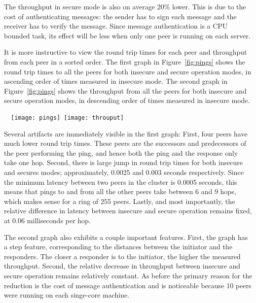 \documentclass[11pt]{article}
\begin{document}
The throughput in secure mode is also on average 20\% lower.  This
is due to the cost of authenticating messages: the sender has to
sign each message and the receiver has to verify the message.  Since
message authentication is a CPU bounded task, its effect will be
less when only one peer is running on each server.

It is more instructive to view the round trip times for each peer
and throughput from each peer in a sorted order.  The first graph
in Figure~\ref{fig:pings} shows the round trip times to all the
peers for both insecure and secure operation modes, in ascending
order of times measured in insecure mode.  The second graph in
Figure~\ref{fig:pings} shows the throughput from all the peers for
both insecure and secure operation modes, in descending order of
times measured in insecure mode.

\begin{figure*}[htb]
  \begin{center}
  \ \mbox{
  \texttt{[image: pings]}\ 
  \texttt{[image: throuput]}}\ 
  \caption{Round trip times to peers.\label{fig:pings}}
  \end{center}
\end{figure*}

Several artifacts are immediately visible in the first graph: First,
four peers have much lower round trip times.  These peers are the
successors and predecessors of the peer performing the ping, and
hence both the ping and the response only take one hop.  Second,
there is large jump in round trip times for both insecure and secures
modes; approximately, 0.0025 and 0.003 seconds respectively.  Since
the minimum latency between two peers in the cluster is 0.0005
seconds, this means that pings to and from all the other peers take
between 6 and 9 hops, which makes sense for a ring of 255 peers.
Lastly, and most importantly, the relative difference in latency
between insecure and secure operation remains fixed, at 0.06
milliseconds per hop.

The second graph also exhibits a couple important features.  First,
the graph has a step feature, corresponding to the distances between
the initiator and the responders.  The closer a responder is to the
initiator, the higher the measured throughput.  Second, the relative
decrease in throughput between insecure and secure operation remains
relatively constant.  As before the primary reason for the reduction
is the cost of message authentication and is noticeable because 
10 peers were running on each singe-core machine.
\end{document}
